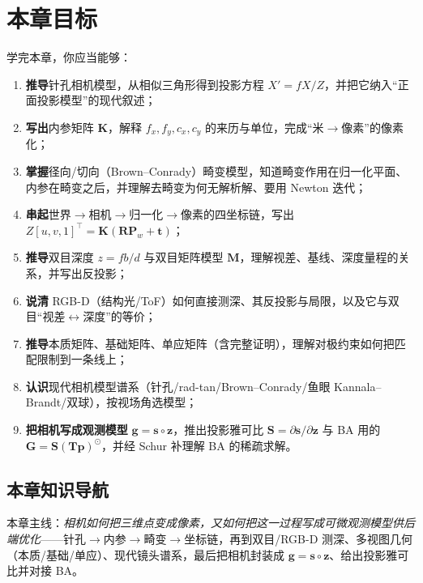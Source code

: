 \section*{本章目标}
学完本章，你应当能够：
\begin{enumerate}
  \item \textbf{推导}针孔相机模型，从相似三角形得到投影方程 $X'=fX/Z$，并把它纳入“正面投影模型”的现代叙述；
  \item \textbf{写出}内参矩阵 $\mathbf{K}$，解释 $f_x,f_y,c_x,c_y$ 的来历与单位，完成“米$\to$像素”的像素化；
  \item \textbf{掌握}径向/切向（Brown--Conrady）畸变模型，知道畸变作用在归一化平面、内参在畸变之后，并理解去畸变为何无解析解、要用 Newton 迭代；
  \item \textbf{串起}世界$\to$相机$\to$归一化$\to$像素的四坐标链，写出 $Z[u,v,1]^\top=\mathbf{K}(\mathbf{R}\mathbf{P}_w+\mathbf{t})$；
  \item \textbf{推导}双目深度 $z=fb/d$ 与双目矩阵模型 $\mathbf{M}$，理解视差、基线、深度量程的关系，并写出反投影；
  \item \textbf{说清} RGB-D（结构光/ToF）如何直接测深、其反投影与局限，以及它与双目“视差$\leftrightarrow$深度”的等价；
  \item \textbf{推导}本质矩阵、基础矩阵、单应矩阵（含完整证明），理解对极约束如何把匹配限制到一条线上；
  \item \textbf{认识}现代相机模型谱系（针孔/rad-tan/Brown--Conrady/鱼眼 Kannala--Brandt/双球），按视场角选模型；
  \item \textbf{把相机写成观测模型} $\mathbf{g}=\mathbf{s}\circ\mathbf{z}$，推出投影雅可比 $\mathbf{S}=\partial\mathbf{s}/\partial\mathbf{z}$ 与 BA 用的 $\mathbf{G}=\mathbf{S}(\mathbf{T}\mathbf{p})^\odot$，并经 Schur 补理解 BA 的稀疏求解。
\end{enumerate}

\subsection*{本章知识导航}
本章主线：\emph{相机如何把三维点变成像素，又如何把这一过程写成可微观测模型供后端优化}——针孔$\to$内参$\to$畸变$\to$坐标链，再到双目/RGB-D 测深、多视图几何（本质/基础/单应）、现代镜头谱系，最后把相机封装成 $\mathbf{g}=\mathbf{s}\circ\mathbf{z}$、给出投影雅可比并对接 BA。

